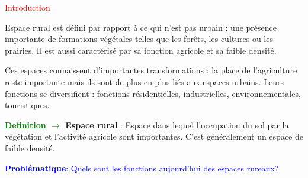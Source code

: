 \documentclass[12pt,a4paper]{article}
\begin{document}
\begin{center}
        \shadowbox{\begin{large}
                \textcolor{red}{G3 Des espaces rureaux aux fonctions de plus en plus variées}
        \end{large}}
    \end{center}
    \vspace{0.5 cm}

\centering
\textcolor{red}{Introduction}\par
\flushleft
Espace rural est défini par rapport à ce qui n’est pas urbain : une présence importante de formations végétales telles que les forêts, les cultures ou les prairies. 
Il est aussi caractérisé par sa fonction agricole et sa faible densité.\par

Ces espaces connaissent d’importantes transformations : la place de l’agriculture reste importante mais ils sont de plus en plus liés aux espaces urbains.
Leurs fonctions se diversifient : fonctions résidentielles, industrielles, environnementales, touristiques.\\ 
    \vspace{0.5 cm}

\textbf{\textcolor{green}{Definition $\rightarrow$ }
Espace rural} : Espace dans lequel l’occupation du sol par la végétation et l’activité agricole sont importantes. C’est généralement un espace de faible densité.\par
    \vspace{0.5 cm}
\centering
\textcolor{blue}{\textbf{ Problématique}: Quels sont les fonctions aujourd'hui des espaces rureaux?}
\flushleft
\end{document}

